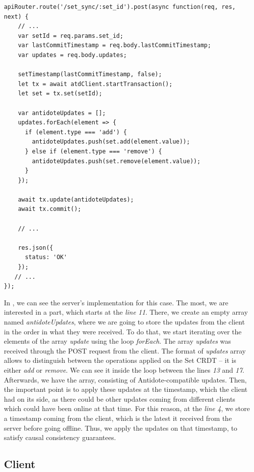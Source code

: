 \begin{lstlisting}[caption={Code for applying an \textit{add} operation to a Set CRDT.}, label={lst:dev3}]
apiRouter.route('/set_sync/:set_id').post(async function(req, res, next) {
    // ...
    var setId = req.params.set_id;
    var lastCommitTimestamp = req.body.lastCommitTimestamp;
    var updates = req.body.updates;

    setTimestamp(lastCommitTimestamp, false);
    let tx = await atdClient.startTransaction();
    let set = tx.set(setId);

    var antidoteUpdates = [];
    updates.forEach(element => {
      if (element.type === 'add') {
        antidoteUpdates.push(set.add(element.value));
      } else if (element.type === 'remove') {
        antidoteUpdates.push(set.remove(element.value));
      }
    });

    await tx.update(antidoteUpdates);
    await tx.commit();
    
    // ...

    res.json({
      status: 'OK'
    });
   // ...
});
\end{lstlisting}

In , we can see the server's implementation for this case. The most, we are interested in a part, which starts at the \textit{line 11}. There, we create an empty array named \textit{antidoteUpdates}, where we are going to store the updates from the client in the order in what they were received. To do that, we start iterating over the elements of the array \textit{update} using the loop \textit{forEach}. The array \textit{updates} was received through the POST request from the client. The format of \textit{updates} array allows to distinguish between the operations applied on the Set CRDT -- it is either \textit{add} or \textit{remove}. We can see it inside the loop between the lines \textit{13} and \textit{17}. Afterwards, we have the array, consisting of Antidote-compatible updates. Then, the important point is to apply these updates at the timestamp, which the client had on its side, as there could be other updates coming from different clients which could have been online at that time. For this reason, at the \textit{line 4}, we store a timestamp coming from the client, which is the latest it received from the server before going offline. Thus, we apply the updates on that timestamp, to satisfy causal consistency guarantees.

\subsection{Client}

